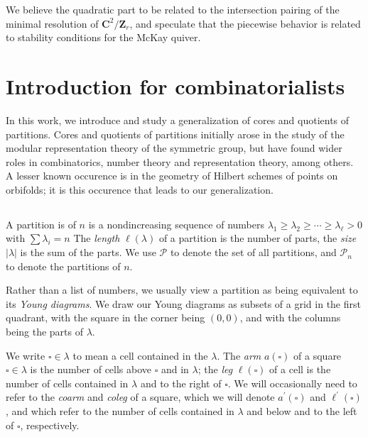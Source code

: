 \documentclass{amsart}[12pt]
\theoremstyle{definition}
\newcommand{\Z}{\mathbf{Z}}
\newcommand{\C}{\mathbf{C}}
\newcommand{\PP}{\mathcal{P}} %
\begin{document}
We believe the quadratic part to be related to the intersection pairing of the minimal resolution of $\C^2/\Z_r$, and speculate that the piecewise behavior is related to stability conditions for the McKay quiver.




\section{Introduction for combinatorialists}
In this work, we introduce and study a generalization of cores and quotients of partitions.  Cores and quotients of partitions initially arose in the study of the modular representation theory of the symmetric group, but have found wider roles in combinatorics, number theory and representation theory, among others.  A lesser known occurence is in the geometry of Hilbert schemes of points on orbifolds; it is this occurence that leads to our generalization.  

\subsection{}
A partition is of $n$ is a nondincreasing sequence of numbers $\lambda_1\geq \lambda_2\geq \cdots \geq \lambda_\ell > 0$ with $\sum \lambda_i=n$  The \emph{length} $\ell(\lambda)$ of a partition is the number of parts, the \emph{size} $|\lambda|$ is the sum of the parts.  We use $\PP$ to denote the set of all partitions, and $\PP_n$ to denote the partitions of $n$.

Rather than a list of numbers, we usually view a partition as being equivalent to its \emph{Young diagrams}.  We draw our Young diagrams as subsets of a grid in the first quadrant, with the square in the corner being $(0,0)$, and with the columns being the parts of $\lambda$.

We write $\square\in\lambda$ to mean a cell contained in the $\lambda$.  The \emph{arm} $a(\square)$ of a square $\square\in\lambda$ is the number of cells above $\square$ and in $\lambda$; the \emph{leg} $\ell(\square)$ of a cell is the number of cells contained in $\lambda$ and to the right of $\square$.  We will occasionally need to refer to the \emph{coarm} and \emph{coleg} of a square, which we will denote $a^\prime(\square)$ and $\ell^\prime(\square)$, and which refer to the number of cells contained in $\lambda$ and below and to the left of $\square$, respectively. 
\end{document}

